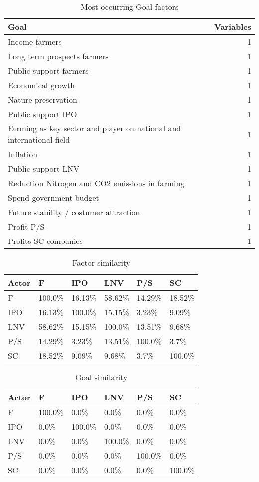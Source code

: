 \begin{table}
\caption{Most occurring Goal factors}
\begin{tabular}{|l|r|}
\hline
Goal & Variables \\
\hline
Income farmers & 1 \\
Long term prospects farmers & 1 \\
Public support farmers & 1 \\
Economical growth & 1 \\
Nature preservation & 1 \\
Public support IPO & 1 \\
Farming as key sector and player on national and international field & 1 \\
Inflation & 1 \\
Public support LNV & 1 \\
Reduction Nitrogen and CO2 emissions in farming & 1 \\
Spend government budget & 1 \\
Future stability / costumer attraction & 1 \\
Profit P/S & 1 \\
Profits SC companies & 1 \\
\hline
\end{tabular}
\end{table}

\begin{table}
\caption{Factor similarity}
\begin{tabular}{|l|l|l|l|l|l|}
\hline
Actor & F & IPO & LNV & P/S & SC \\
\hline
F & 100.0\% & 16.13\% & 58.62\% & 14.29\% & 18.52\% \\
IPO & 16.13\% & 100.0\% & 15.15\% & 3.23\% & 9.09\% \\
LNV & 58.62\% & 15.15\% & 100.0\% & 13.51\% & 9.68\% \\
P/S & 14.29\% & 3.23\% & 13.51\% & 100.0\% & 3.7\% \\
SC & 18.52\% & 9.09\% & 9.68\% & 3.7\% & 100.0\% \\
\hline
\end{tabular}
\end{table}

\begin{table}
\caption{Goal similarity}
\begin{tabular}{|l|l|l|l|l|l|}
\hline
Actor & F & IPO & LNV & P/S & SC \\
\hline
F & 100.0\% & 0.0\% & 0.0\% & 0.0\% & 0.0\% \\
IPO & 0.0\% & 100.0\% & 0.0\% & 0.0\% & 0.0\% \\
LNV & 0.0\% & 0.0\% & 100.0\% & 0.0\% & 0.0\% \\
P/S & 0.0\% & 0.0\% & 0.0\% & 100.0\% & 0.0\% \\
SC & 0.0\% & 0.0\% & 0.0\% & 0.0\% & 100.0\% \\
\hline
\end{tabular}
\end{table}

